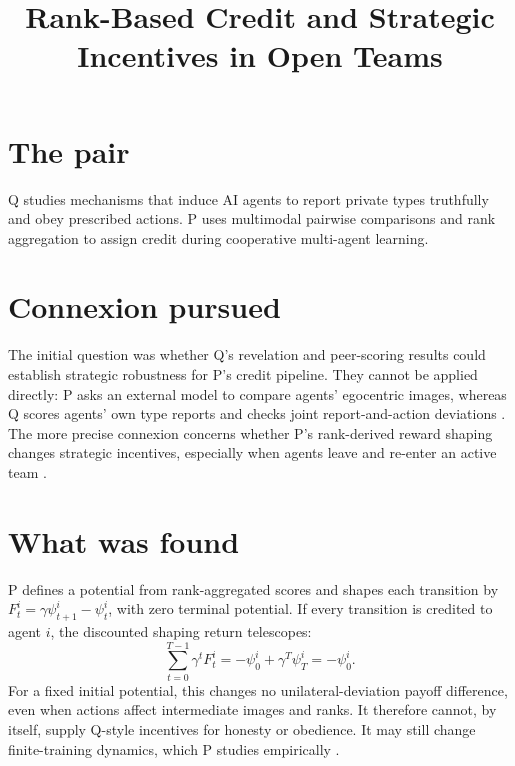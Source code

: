 \documentclass{article}
\title{Rank-Based Credit and Strategic Incentives in Open Teams}
\begin{document}
\maketitle

\section*{The pair}

Q studies mechanisms that induce AI agents to report private types truthfully and obey prescribed actions. P uses multimodal pairwise comparisons and rank aggregation to assign credit during cooperative multi-agent learning.

\section*{Connexion pursued}

The initial question was whether Q's revelation and peer-scoring results could establish strategic robustness for P's credit pipeline. They cannot be applied directly: P asks an external model to compare agents' egocentric images, whereas Q scores agents' own type reports and checks joint report-and-action deviations . The more precise connexion concerns whether P's rank-derived reward shaping changes strategic incentives, especially when agents leave and re-enter an active team .

\section*{What was found}

P defines a potential from rank-aggregated scores and shapes each transition by \(F_t^i=\gamma\psi_{t+1}^i-\psi_t^i\), with zero terminal potential. If every transition is credited to agent \(i\), the discounted shaping return telescopes:
\[
\sum_{t=0}^{T-1}\gamma^t F_t^i
=
-\psi_0^i+\gamma^T\psi_T^i
=
-\psi_0^i.
\]
For a fixed initial potential, this changes no unilateral-deviation payoff difference, even when actions affect intermediate images and ranks. It therefore cannot, by itself, supply Q-style incentives for honesty or obedience. It may still change finite-training dynamics, which P studies empirically .
\end{document}
